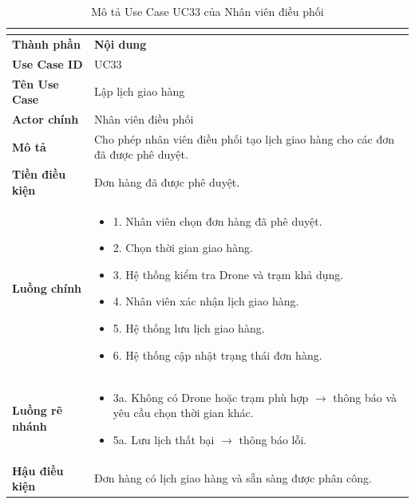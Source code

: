 \begin{longtable}{|C{3cm}|L{11cm}|}
\caption{Mô tả Use Case UC33 của Nhân viên điều phối}\\
\label{tab:mo-ta-uc33-dieu-phoi}\\
\hline
\textbf{Thành phần} & \textbf{Nội dung} \\
\hline
\textbf{Use Case ID} & UC33 \\
\hline
\textbf{Tên Use Case} & Lập lịch giao hàng \\
\hline
\textbf{Actor chính} & Nhân viên điều phối \\
\hline
\textbf{Mô tả} &
Cho phép nhân viên điều phối tạo lịch giao hàng cho các đơn đã được phê duyệt. \\
\hline
\textbf{Tiền điều kiện} &
Đơn hàng đã được phê duyệt. \\
\hline
\textbf{Luồng chính} &
\begin{itemize}[leftmargin=*,topsep=2pt,itemsep=2pt]
    \item 1. Nhân viên chọn đơn hàng đã phê duyệt.
    \item 2. Chọn thời gian giao hàng.
    \item 3. Hệ thống kiểm tra Drone và trạm khả dụng.
    \item 4. Nhân viên xác nhận lịch giao hàng.
    \item 5. Hệ thống lưu lịch giao hàng.
    \item 6. Hệ thống cập nhật trạng thái đơn hàng.
\end{itemize} \\
\hline
\textbf{Luồng rẽ nhánh} &
\begin{itemize}[leftmargin=*,topsep=2pt,itemsep=2pt]
    \item 3a. Không có Drone hoặc trạm phù hợp $\rightarrow$ thông báo và yêu cầu chọn thời gian khác.
    \item 5a. Lưu lịch thất bại $\rightarrow$ thông báo lỗi.
\end{itemize} \\
\hline
\textbf{Hậu điều kiện} &
Đơn hàng có lịch giao hàng và sẵn sàng được phân công. \\
\hline
\end{longtable}


